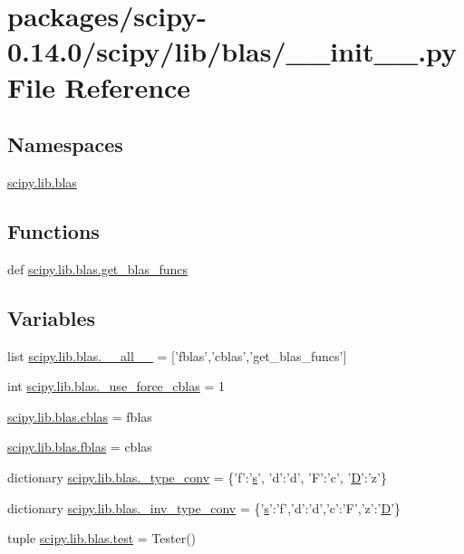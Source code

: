 \hypertarget{packages_2scipy-0_814_80_2scipy_2lib_2blas_2____init_____8py}{}\section{packages/scipy-\/0.14.0/scipy/lib/blas/\+\_\+\+\_\+init\+\_\+\+\_\+.py File Reference}
\label{packages_2scipy-0_814_80_2scipy_2lib_2blas_2____init_____8py}
\subsection*{Namespaces}
\begin{DoxyCompactItemize}
\item 
 \hyperlink{namespacescipy_1_1lib_1_1blas}{scipy.\+lib.\+blas}
\end{DoxyCompactItemize}
\subsection*{Functions}
\begin{DoxyCompactItemize}
\item 
def \hyperlink{namespacescipy_1_1lib_1_1blas_ad990eae2f5ced520bf4de13a2d0a7cc0}{scipy.\+lib.\+blas.\+get\+\_\+blas\+\_\+funcs}
\end{DoxyCompactItemize}
\subsection*{Variables}
\begin{DoxyCompactItemize}
\item 
list \hyperlink{namespacescipy_1_1lib_1_1blas_a77b86f1a74caf75eaa8989a8dc26b135}{scipy.\+lib.\+blas.\+\_\+\+\_\+all\+\_\+\+\_\+} = \mbox{[}'fblas','cblas','get\+\_\+blas\+\_\+funcs'\mbox{]}
\item 
int \hyperlink{namespacescipy_1_1lib_1_1blas_a2e3e14899f9b784a8b934964ee5b3eb7}{scipy.\+lib.\+blas.\+\_\+use\+\_\+force\+\_\+cblas} = 1
\item 
\hyperlink{namespacescipy_1_1lib_1_1blas_a2fa2776dc97751a7ac274545e214a119}{scipy.\+lib.\+blas.\+cblas} = fblas
\item 
\hyperlink{namespacescipy_1_1lib_1_1blas_ad33470cadc93d1c9584675eba6982868}{scipy.\+lib.\+blas.\+fblas} = cblas
\item 
dictionary \hyperlink{namespacescipy_1_1lib_1_1blas_a31c884838b834922b61a9a316d2345ae}{scipy.\+lib.\+blas.\+\_\+type\+\_\+conv} = \{'f'\+:'\hyperlink{indexexpr_8h_ae024b0db549122b44c349ae28ec990dc}{s}', 'd'\+:'d', 'F'\+:'c', '\hyperlink{odrpack_8h_a7dae6ea403d00f3687f24a874e67d139}{D}'\+:'z'\}
\item 
dictionary \hyperlink{namespacescipy_1_1lib_1_1blas_a47b1f81cd7b79943c15e0a88f7814a9b}{scipy.\+lib.\+blas.\+\_\+inv\+\_\+type\+\_\+conv} = \{'\hyperlink{indexexpr_8h_ae024b0db549122b44c349ae28ec990dc}{s}'\+:'f','d'\+:'d','c'\+:'F','z'\+:'\hyperlink{odrpack_8h_a7dae6ea403d00f3687f24a874e67d139}{D}'\}
\item 
tuple \hyperlink{namespacescipy_1_1lib_1_1blas_a48d646112fdab56b6166bd0f331feeb7}{scipy.\+lib.\+blas.\+test} = Tester()
\end{DoxyCompactItemize}

